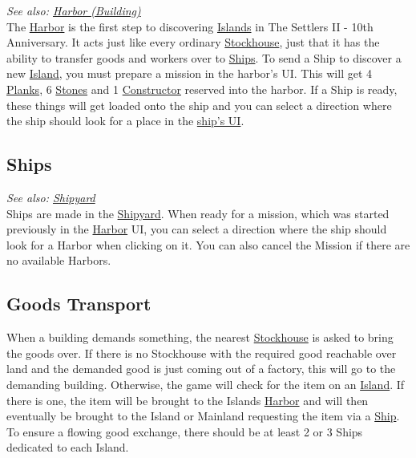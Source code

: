 \documentclass[12pt]{article}
\begin{document}
\textit{See also: \hyperref[sec:harbor_building]{Harbor (Building)}}\\

The \hyperref[sec:building_harbor]{Harbor} is the first step to discovering \hyperref[sec:islands]{Islands} in The Settlers II - 10th Anniversary. It acts just like every ordinary \hyperref[sec:stockhouse]{Stockhouse}, just that it has the ability to transfer goods and workers over to \hyperref[sec:ships]{Ships}. To send a Ship to discover a new \hyperref[sec:islands]{Island}, you must prepare a mission in the harbor's UI. This will get 4 \hyperref[sec:plank]{Planks}, 6 \hyperref[sec:stone]{Stones} and 1 \hyperref[sec:constructor]{Constructor} reserved into the harbor. If a {Ship} is ready, these things will get loaded onto the ship and you can select a direction where the ship should look for a place in the \hyperref[sec:ships]{ship's UI}.

\subsection{Ships}
\label{sec:ships}

\textit{See also: \hyperref[sec:shipyard]{Shipyard}}\\

Ships are made in the \hyperref[sec:shipyard]{Shipyard}. When ready for a mission, which was started previously in the \hyperref[sec:harbor]{Harbor} UI, you can select a direction where the ship should look for a Harbor when clicking on it. You can also cancel the Mission if there are no available Harbors.

\subsection{Goods Transport}
\label{sec:goodstransport}

When a building demands something, the nearest \hyperref[sec:stockhouse]{Stockhouse} is asked to bring the goods over. If there is no Stockhouse with the required good reachable over land and the demanded good is just coming out of a factory, this will go to the demanding building. Otherwise, the game will check for the item on an \hyperref[sec:islands]{Island}. If there is one, the item will be brought to the Islands \hyperref[sec:harbor]{Harbor} and will then eventually be brought to the Island or Mainland requesting the item via a \hyperref[sec:ships]{Ship}. To ensure a flowing good exchange, there should be at least 2 or 3 Ships dedicated to each Island.
\end{document}
